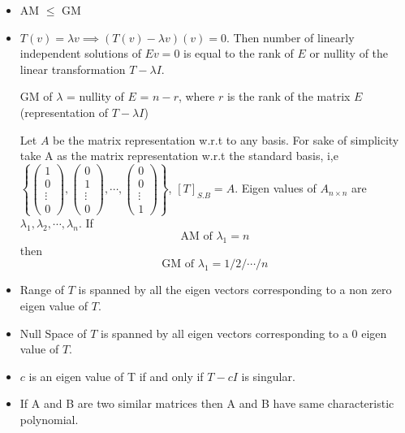 \documentclass[a4paper, titlepage]{article}
\begin{document}
        \begin{itemize}
            \item AM $\le$ GM
            \item $T(v) = \lambda v \implies (T(v) - \lambda v)(v) = 0$.
                  Then number of linearly independent solutions of 
                  $Ev = 0$ is equal to the rank of $E$ or nullity of
                  the linear transformation $T - \lambda I$. 
                  
                  GM of $\lambda$ = nullity of $E$ = $n-r$, where
                  $r$ is the rank of the matrix $E$ (representation
                  of $T - \lambda I$)

                  Let $A$ be the matrix representation w.r.t to any 
                  basis. For sake of simplicity take A as the matrix 
                  representation w.r.t the standard basis, i,e 
                  $\left\{ 
                      \begin{pmatrix*} 1 \\ 0 \\ \vdots \\ 0 \end{pmatrix*},
                      \begin{pmatrix*} 0 \\ 1 \\ \vdots \\ 0 \end{pmatrix*},
                      \cdots,
                      \begin{pmatrix*} 0 \\ 0 \\ \vdots \\ 1 \end{pmatrix*}
                  \right\}$, $[T]_{S.B} = A$.
                  Eigen values of $A_{n\times n}$ are $\lambda_1, 
                  \lambda_2, \cdots, \lambda_n$. If
                      $$\text{AM of $\lambda_1$} = n$$
                  then
                      $$\text{GM of $\lambda_1$} = 1/2/\cdots/n$$
            \item Range of $T$ is spanned by all the eigen vectors 
                  corresponding to a non zero eigen value of $T$.
            \item Null Space of $T$ is spanned by all eigen vectors 
                  corresponding to a 0 eigen value of $T$.
            \item $c$ is an eigen value of T if and only if $T - cI$
                  is singular.
            \item If A and B are two similar matrices then A and B
                  have same characteristic polynomial.
        \end{itemize}
\end{document}
